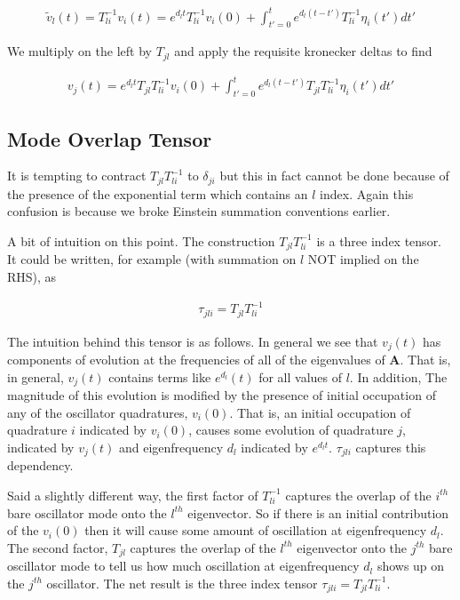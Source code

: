 \documentclass[12pt]{article}
\newcommand{\bv}[1]{\boldsymbol{#1}}
\begin{document}
\begin{align}
\tilde{v}_l(t) = T^{-1}_{li}v_i(t) = e^{d_l t}T^{-1}_{li}v_i(0) + \int_{t'=0}^{t}e^{d_l(t-t')}T^{-1}_{li}\eta_i(t')dt'
\end{align}

We multiply on the left by $T_{jl}$ and apply the requisite kronecker deltas to find

\begin{align}
v_j(t) = e^{d_l t} T_{jl}T^{-1}_{li} v_i(0) + \int_{t'=0}^{t} e^{d_l(t-t')}T_{jl}T^{-1}_{li}\eta_i(t')dt'
\end{align}

\subsection{Mode Overlap Tensor}

It is tempting to contract $T_{jl}T^{-1}_{li}$ to $\delta_{ji}$ but this in fact cannot be done because of the presence of the exponential term which contains an $l$ index. Again this confusion is because we broke Einstein summation conventions earlier.

A bit of intuition on this point. The construction $T_{jl}T^{-1}_{li}$ is a three index tensor. It could be written, for example (with summation on $l$ NOT implied on the RHS), as

\begin{align}
\tau_{jli} = T_{jl}T^{-1}_{li}
\end{align}

The intuition behind this tensor is as follows. In general we see that $v_j(t)$ has components of evolution at the frequencies of all of the eigenvalues of $\bv{A}$. That is, in general, $v_j(t)$ contains terms like $e^{d_l}(t)$ for all values of $l$. In addition, The magnitude of this evolution is modified by the presence of initial occupation of any of the oscillator quadratures, $v_i(0)$. That is, an initial occupation of quadrature $i$ indicated by $v_i(0)$, causes some evolution of quadrature $j$, indicated by $v_j(t)$ and eigenfrequency $d_l$ indicated by $e^{d_l t}$. $\tau_{jli}$ captures this dependency.

Said a slightly different way, the first factor of $T^{-1}_{li}$ captures the overlap of the $i^{th}$ bare oscillator mode onto the $l^{th}$ eigenvector. So if there is an initial contribution of the $v_i(0)$ then it will cause some amount of oscillation at eigenfrequency $d_l$. The second factor, $T_{jl}$ captures the overlap of the $l^{th}$ eigenvector onto the $j^{th}$ bare oscillator mode to tell us how much oscillation at eigenfrequency $d_l$ shows up on the $j^{th}$ oscillator. The net result is the three index tensor $\tau_{jli} = T_{jl}T^{-1}_{li}$.
\end{document}
